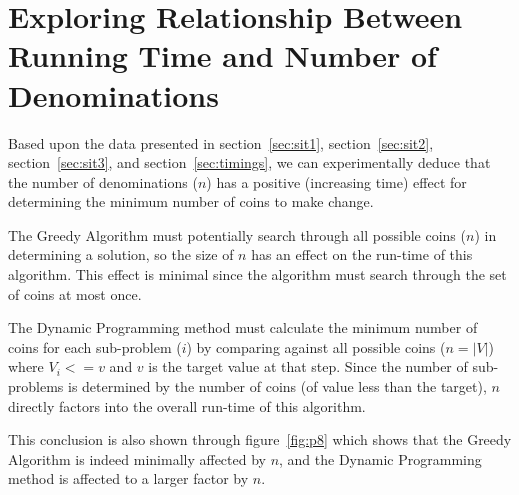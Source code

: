 \documentclass[11pt]{scrreprt}
\begin{document}
\section{Exploring Relationship Between Running Time and Number of Denominations}

Based upon the data presented in section~\ref{sec:sit1}, section~\ref{sec:sit2}, section~\ref{sec:sit3}, and section~\ref{sec:timings}, we can experimentally deduce that the number of denominations ($n$) has a positive (increasing time) effect for determining the minimum number of coins to make change.

The Greedy Algorithm must potentially search through all possible coins ($n$) in determining a solution, so the size of $n$ has an effect on the run-time of this algorithm. This effect is minimal since the algorithm must search through the set of coins at most once.

The Dynamic Programming method must calculate the minimum number of coins for each sub-problem ($i$) by comparing against all possible coins ($n = |V|$) where $V_i <= v$ and $v$ is the target value at that step. Since the number of sub-problems is determined by the number of coins (of value less than the target), $n$ directly factors into the overall run-time of this algorithm.

This conclusion is also shown through figure~\ref{fig:p8} which shows that the Greedy Algorithm is indeed minimally affected by $n$, and the Dynamic Programming method is affected to a larger factor by $n$. 
\end{document}
